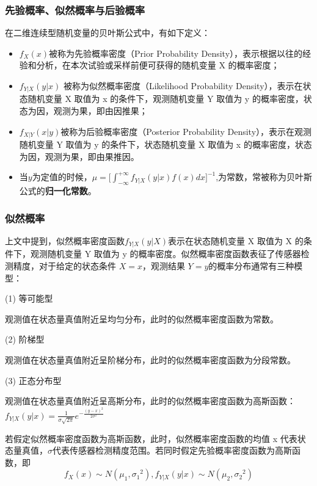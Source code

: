 \documentclass[12pt]{ctexart}
\begin{document}
\subsubsection{先验概率、似然概率与后验概率}
在二维连续型随机变量的贝叶斯公式中，有如下定义：
\begin{itemize}
    \item $f_X(x)$被称为先验概率密度（Prior Probability Density），表示根据以往的经验和分析，在本次试验或采样前便可获得的随机变量 X 的概率密度；
    \item $f_{Y|X}(y|x)$ 被称为似然概率密度（Likelihood Probability Density），表示在状态随机变量 X 取值为 x 的条件下，观测随机变量 Y 取值为 y 的概率密度，状态为因，观测为果，即由因推果；
    \item $f_{X|Y}(x|y)$被称为后验概率密度（Posterior Probability Density），表示在观测随机变量 Y 取值为 y 的条件下，状态随机变量 X 取值为 x 的概率密度，状态为因，观测为果，即由果推因。
    \item 当$y$为定值的时候，$\mu= \displaystyle \big[ \int_{-\infty}^{+\infty}f_{Y|X}(y|x)f(x)dx \big]^{-1}$,为常数，常被称为贝叶斯公式的\textbf{归一化常数}。
\end{itemize}

\subsubsection{似然概率}
上文中提到，似然概率密度函数$f_{Y|X}(y|X)$表示在状态随机变量 X 取值为 X 的条件下，观测随机变量 Y  取值为 y 的概率密度。似然概率密度函数表征了传感器检测精度，对于给定的状态条件 $X=x$，观测结果 $Y=y$的概率分布通常有三种模型：

(1) 等可能型

观测值在状态量真值附近呈均匀分布，此时的似然概率密度函数为常数。

(2) 阶梯型

观测值在状态量真值附近呈阶梯分布，此时的似然概率密度函数为分段常数。

(3) 正态分布型

观测值在状态量真值附近呈高斯分布，此时的似然概率密度函数为高斯函数：$\displaystyle f_{Y|X}(y|x) = \frac{1}{\sigma \sqrt{2\pi}}e^{-\frac{(y-x)^2}{2{\sigma}^2}}$

若假定似然概率密度函数为高斯函数，此时，似然概率密度函数的均值 x 代表状态量真值，$\sigma$代表传感器检测精度范围。若同时假定先验概率密度函数为高斯函数，即
\begin{equation}
    f_X(x) \sim N(\mu_1,{\sigma_1}^2), f_{Y|X}(y|x)\sim N(\mu_2,{\sigma_2}^2)
\end{equation}
\end{document}
